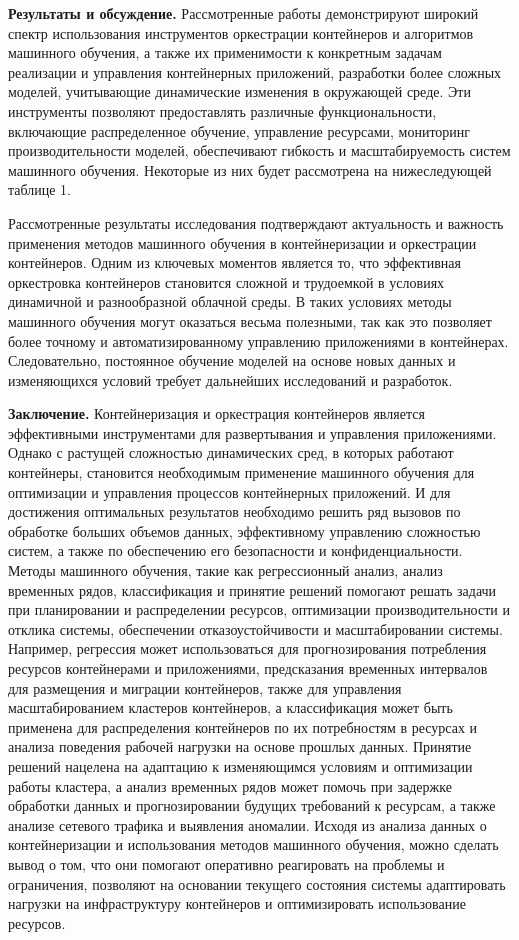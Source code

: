 \begin{multicols}{2}
{\bfseries Результаты и обсуждение.} Рассмотренные работы демонстрируют
широкий спектр использования инструментов оркестрации контейнеров и
алгоритмов машинного обучения, а также их применимости к конкретным
задачам реализации и управления контейнерных приложений, разработки
более сложных моделей, учитывающие динамические изменения в окружающей
среде. Эти инструменты позволяют предоставлять различные
функциональности, включающие распределенное обучение, управление
ресурсами, мониторинг производительности моделей, обеспечивают гибкость
и масштабируемость систем машинного обучения. Некоторые из них будет
рассмотрена на нижеследующей таблице 1.

Рассмотренные результаты исследования подтверждают актуальность и
важность применения методов машинного обучения в контейнеризации и
оркестрации контейнеров. Одним из ключевых моментов является то, что
эффективная оркестровка контейнеров становится сложной и трудоемкой в
условиях динамичной и разнообразной облачной среды. В таких условиях
методы машинного обучения могут оказаться весьма полезными, так как это
позволяет более точному и автоматизированному управлению приложениями в
контейнерах. Следовательно, постоянное обучение моделей на основе новых
данных и изменяющихся условий требует дальнейших исследований и
разработок.

{\bfseries Заключение.} Контейнеризация и оркестрация контейнеров является
эффективными инструментами для развертывания и управления приложениями.
Однако с растущей сложностью динамических сред, в которых работают
контейнеры, становится необходимым применение машинного обучения для
оптимизации и управления процессов контейнерных приложений. И для
достижения оптимальных результатов необходимо решить ряд вызовов по
обработке больших объемов данных, эффективному управлению сложностью
систем, а также по обеспечению его безопасности и конфиденциальности.
Методы машинного обучения, такие как регрессионный анализ, анализ
временных рядов, классификация и принятие решений помогают решать задачи
при планировании и распределении ресурсов, оптимизации
производительности и отклика системы, обеспечении отказоустойчивости и
масштабировании системы. Например, регрессия может использоваться для
прогнозирования потребления ресурсов контейнерами и приложениями,
предсказания временных интервалов для размещения и миграции контейнеров,
также для управления масштабированием кластеров контейнеров, а
классификация может быть применена для распределения контейнеров по их
потребностям в ресурсах и анализа поведения рабочей нагрузки на основе
прошлых данных. Принятие решений нацелена на адаптацию к изменяющимся
условиям и оптимизации работы кластера, а анализ временных рядов может
помочь при задержке обработки данных и прогнозировании будущих
требований к ресурсам, а также анализе сетевого трафика и выявления
аномалии. Исходя из анализа данных о контейнеризации и использования
методов машинного обучения, можно сделать вывод о том, что они помогают
оперативно реагировать на проблемы и ограничения, позволяют на основании
текущего состояния системы адаптировать нагрузки на инфраструктуру
контейнеров и оптимизировать использование ресурсов.
\end{multicols}


